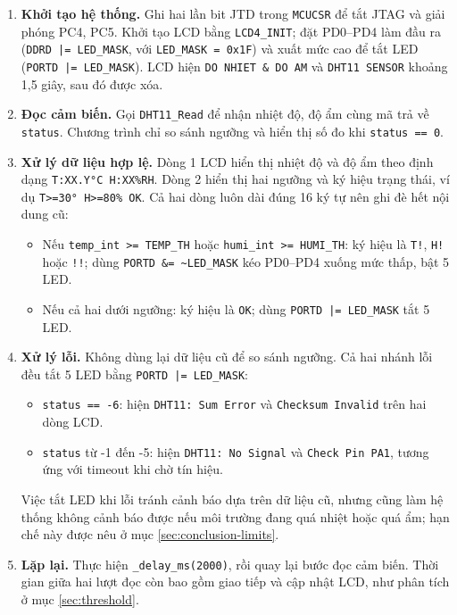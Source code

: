 \begin{enumerate}[leftmargin=0.8cm,itemsep=6pt,parsep=0pt,topsep=4pt]
    \item \textbf{Khởi tạo hệ thống.} Ghi hai lần bit JTD trong \texttt{MCUCSR} để tắt JTAG và giải phóng PC4, PC5. Khởi tạo LCD bằng \texttt{LCD4\_INIT}; đặt PD0--PD4 làm đầu ra (\texttt{DDRD |= LED\_MASK}, với \texttt{LED\_MASK = 0x1F}) và xuất mức cao để tắt LED (\texttt{PORTD |= LED\_MASK}). LCD hiện \texttt{DO NHIET \& DO AM} và \texttt{DHT11 SENSOR} khoảng 1,5 giây, sau đó được xóa.
    \item \textbf{Đọc cảm biến.} Gọi \texttt{DHT11\_Read} để nhận nhiệt độ, độ ẩm cùng mã trả về \texttt{status}. Chương trình chỉ so sánh ngưỡng và hiển thị số đo khi \texttt{status == 0}.
    \item \textbf{Xử lý dữ liệu hợp lệ.} Dòng 1 LCD hiển thị nhiệt độ và độ ẩm theo định dạng \texttt{T:XX.Y°C H:XX\%RH}. Dòng 2 hiển thị hai ngưỡng và ký hiệu trạng thái, ví dụ \texttt{T>=30° H>=80\% OK}. Cả hai dòng luôn dài đúng 16 ký tự nên ghi đè hết nội dung cũ:
    \begin{itemize}[leftmargin=0.6cm,itemsep=3pt,topsep=3pt]
        \item Nếu \texttt{temp\_int >= TEMP\_TH} hoặc \texttt{humi\_int >= HUMI\_TH}: ký hiệu là \texttt{T!}, \texttt{H!} hoặc \texttt{!!}; dùng \texttt{PORTD \&= \textasciitilde LED\_MASK} kéo PD0--PD4 xuống mức thấp, bật 5 LED.
        \item Nếu cả hai dưới ngưỡng: ký hiệu là \texttt{OK}; dùng \texttt{PORTD |= LED\_MASK} tắt 5 LED.
    \end{itemize}
    \item \textbf{Xử lý lỗi.} Không dùng lại dữ liệu cũ để so sánh ngưỡng. Cả hai nhánh lỗi đều tắt 5 LED bằng \texttt{PORTD |= LED\_MASK}:
    \begin{itemize}[leftmargin=0.6cm,itemsep=3pt,topsep=3pt]
        \item \texttt{status == -6}: hiện \texttt{DHT11: Sum Error} và \texttt{Checksum Invalid} trên hai dòng LCD.
        \item \texttt{status} từ -1 đến -5: hiện \texttt{DHT11: No Signal} và \texttt{Check Pin PA1}, tương ứng với timeout khi chờ tín hiệu.
    \end{itemize}
    Việc tắt LED khi lỗi tránh cảnh báo dựa trên dữ liệu cũ, nhưng cũng làm hệ thống không cảnh báo được nếu môi trường đang quá nhiệt hoặc quá ẩm; hạn chế này được nêu ở mục \ref{sec:conclusion-limits}.
    \item \textbf{Lặp lại.} Thực hiện \texttt{\_delay\_ms(2000)}, rồi quay lại bước đọc cảm biến. Thời gian giữa hai lượt đọc còn bao gồm giao tiếp và cập nhật LCD, như phân tích ở mục \ref{sec:threshold}.
\end{enumerate}

